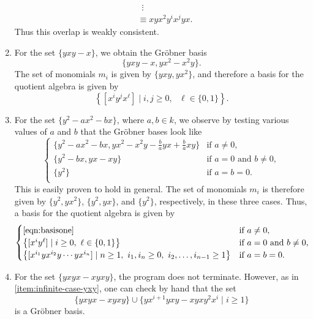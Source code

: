 \begin{enumerate}
\begin{align*}
    	&\hspace{6pt} \vdots\\
    	&\equiv xyx^2 y^i x^j yx.
    \end{align*}
	Thus this overlap is weakly consistent.
	\item For the set $\{yxy-x\}$, we obtain the Gr\"obner basis
	\begin{equation*}
		\{yxy-x,yx^2-x^2y\}.
	\end{equation*}
    The set of monomials $m_i$ is given by $\{yxy,yx^2\}$, and therefore a basis for the quotient algebra is given by
    \begin{equation*}
      \left\{[x^iy^jx^\ell]\mid i,j\ge 0,\text{ }\ell\in\{0,1\}\right\}.
    \end{equation*}
	\item For the set $\{y^2-ax^2-bx\}$, where $a,b\in k$, we observe by testing various values of $a$ and $b$ that the Gr\"obner bases look like
      \begin{equation*}
\begin{cases}
\{y^2-ax^2-bx,yx^2-x^2y-\frac{b}{a}yx+\frac{b}{a}xy\}&\text{if }a\ne 0,\\
\{y^2-bx,yx-xy\}&\text{if }a=0\text{ and }b\ne 0,\\
\{y^2\}&\text{if }a=b=0.\\
\end{cases}
        \end{equation*}
      This is easily proven to hold in general. The set of monomials $m_i$ is therefore given by $\{y^2,yx^2\}$, $\{y^2,yx\}$, and $\{y^2\}$, respectively, in these three cases. Thus, a basis for the quotient algebra is given by
      \begin{equation*}
\begin{cases}
\eqref{eqn:basisone}&\text{if }a\ne 0,\\
\left\{[x^iy^\ell]\mid i\ge 0,\text{ }\ell\in\{0,1\}\right\}&\text{if }a=0\text{ and }b\ne 0,\\
\left\{[x^{i_1}yx^{i_2}y\cdots yx^{i_n}]\mid n\ge 1,\text{ }i_1,i_n\ge 0,\text{ }i_2,\ldots,i_{n-1}\ge 1\right\}&\text{if }a=b=0.\\
\end{cases}
      \end{equation*}
	\item For the set $\{yxyx-xyxy\}$, the program does not terminate. However, as in \eqref{item:infinite-case-yxy}, one can check by hand that the set
	\[
		\{yxyx - xyxy\} \cup \{yx^{i+1}yxy - xyxy^2 x^i \mid i \geq 1\}
	\]
	is a Gr\"obner basis.

\end{enumerate}
